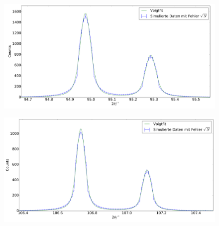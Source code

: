 \begin{figure}[H]
\begin{minipage}{.52\textwidth}
  \centering
  \includegraphics[scale=0.18]{Simulation_Siliciumpulver_7}
  \label{fig:pul_sim_sil_7}
\end{minipage}
\hspace{0.2cm}
\begin{minipage}{.52\textwidth}
  \centering
  \includegraphics[scale=0.18]{Simulation_Siliciumpulver_8}
  \label{fig:pul_sim_sil_8}
\end{minipage}
\end{figure}

